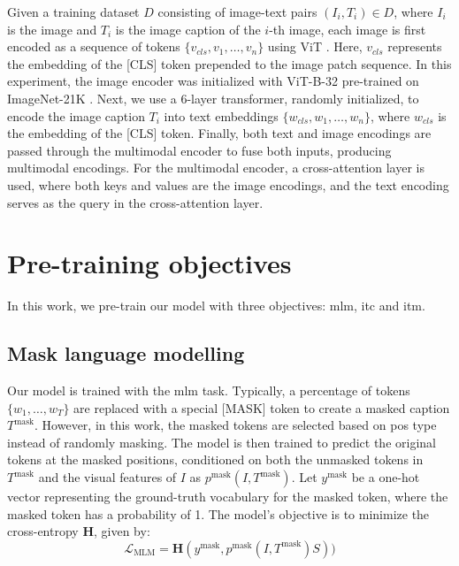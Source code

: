 Given a training dataset \(D\) consisting of image-text pairs \((I_i, T_i) \in D\), where \(I_i\) is the image and \(T_i\) is the image caption of the \(i\)-th image, each image is first encoded as a sequence of tokens \(\{v_{cls}, v_1, \dots, v_n\}\) using ViT \cite{vit}. 
Here, \(v_{cls}\) represents the embedding of the [CLS] token prepended to the image patch sequence. 
In this experiment, the image encoder was initialized with ViT-B-32 pre-trained on ImageNet-21K \cite{imagenet}.
Next, we use a 6-layer transformer, randomly initialized, to encode the image caption \(T_i\) into text embeddings \(\{w_{cls}, w_1, \dots, w_n\}\), where \(w_{cls}\) is the embedding of the [CLS] token. 
Finally, both text and image encodings are passed through the multimodal encoder to fuse both inputs, producing multimodal encodings. 
For the multimodal encoder, a cross-attention layer is used, where both keys and values are the image encodings, and the text encoding serves as the query in the cross-attention layer.


\section{Pre-training objectives}
In this work, we pre-train our model with three objectives: \acrfull{mlm}, \acrfull{itc} and \acrfull{itm}.
\subsection{Mask language modelling}
Our model is trained with the \acrshort{mlm} task. 
Typically, a percentage of tokens \(\{w_1, \dots, w_T\}\) are replaced with a special [MASK] token to create a masked caption \(T^{\text{mask}}\). 
However, in this work, the masked tokens are selected based on \acrshort{pos} type instead of randomly masking. 
The model is then trained to predict the original tokens at the masked positions, conditioned on both the unmasked tokens in \(T^{\text{mask}}\) and the visual features of \(I\) as \(p^{\text{mask}}(I, T^{\text{mask}})\).
Let \(y^{\text{mask}}\) be a one-hot vector representing the ground-truth vocabulary for the masked token, where the masked token has a probability of 1. 
The model’s objective is to minimize the cross-entropy \(\mathbf{H}\), given by:
\[
    \mathcal{L}_{\text{MLM}} = \mathbf{H}(y^{\text{mask}}, p^{\text{mask}}(I, T^{\text{mask}})S))
\]

